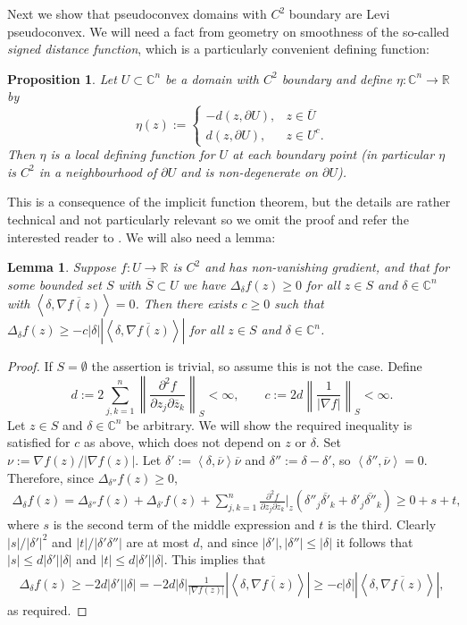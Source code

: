 \documentclass[11pt,a4paper, final, twoside]{article}
\newtheorem{lemma}[theorem]{Lemma}
\newtheorem{proposition}[theorem]{Proposition}
\numberwithin{equation}{section}
\newcommand{\C}{\mathbb C}
\newcommand{\R}{\mathbb R}
\newcommand{\con}[1]{\overline{#1}}
\newcommand{\clos}[1]{\overline{#1}}
\newcommand{\bd}{\partial}
\newcommand{\emetric}{d}
\newcommand{\cts}{C}
\renewcommand{\sp}[2]{\left<#1,#2\right>}
\newcommand{\sprod}[2]{\sp{#1}{#2}}
\newcommand{\cgrad}[1]{\nabla #1}
\begin{document}
Next we show that pseudoconvex domains with $\cts^2$ boundary are Levi pseudoconvex.
We will need a fact from geometry on smoothness of the so-called \emph{signed distance function}, which is a particularly convenient defining function:
\begin{proposition}
\label{sigsmooth}
Let $U\subset\C^n$ be a domain with $\cts^2$ boundary and define $\eta\colon\C^n\to\R$ by
$$ \eta(z) := \begin{cases} -\emetric(z,\bd U),& z\in\clos{U} \\ \emetric(z,\bd U),& z\in U^c.\end{cases}$$
Then $\eta$ is a local defining function for $U$ at each boundary point (in particular $\eta$ is $C^2$ in a neighbourhood of $\bd U$ and is non-degenerate on $\bd U$).
\end{proposition}
This is a consequence of the implicit function theorem, but the details are rather technical and not particularly relevant so we omit the proof and refer the interested 
reader to \cite[page 136]{krantz}.
We will also need a lemma:
\begin{lemma}
\label{levilemma}
Suppose $f\colon U\to\R$ is $\cts^2$ and has non-vanishing gradient, and that for some bounded set $S$ with $\clos{S}\subset U$ we have
$\Delta_\delta f(z)\geq 0$ for all $z\in S$ and $\delta\in\C^n$ with $\sprod{\delta}{\con{\cgrad{f}(z)}}=0$. Then there exists $c\geq 0$ such that 
$\Delta_\delta f(z)\geq -c|\delta|\left|\sprod{\delta}{\con{\cgrad{f}(z)}}\right|$ for all $z\in S$ and $\delta\in\C^n$.
\end{lemma}
\begin{proof}
If $S=\emptyset$ the assertion is trivial, so assume this is not the case.
Define
$$ d:=2\sum_{j,k=1}^n \left\|\frac{\partial^2f}{\partial z_j\partial\con z_k}\right\|_S<\infty, \qquad c:=2d\left\|\frac{1}{\left|\cgrad{f}\right|}\right\|_S<\infty.$$
Let $z\in S$ and $\delta\in\C^n$ be arbitrary. We will show the required inequality is satisfied for $c$ as above, which does not depend on $z$ or $\delta$.
Set $\nu:=\cgrad{f}(z)/\left|\cgrad{f}(z)\right|$. Let $\delta':=\sprod{\delta}{\con\nu}\con\nu$ and $\delta'':=\delta-\delta'$, so $\sprod{\delta''}{\con\nu}=0$.
Therefore, since $\Delta_{\delta''}f(z)\geq 0$, 
\begin{align*}
 \Delta_\delta f(z)=\Delta_{\delta''} f(z)+\Delta_{\delta'} f(z)+\sum_{j,k=1}^n \frac{\partial^2f}{\partial z_j\partial\con z_k}\bigg|_z \left(\delta''_j\con{\delta'}_k+\delta'_j\con{\delta''}_k\right) 
	\geq 0+s+t,
\end{align*}
where $s$ is the second term of the middle expression and $t$ is the third. Clearly $|s|/|\delta'|^2$ and $|t|/|\delta'\delta''|$ are at most $d$,
and since $|\delta'|,|\delta''|\leq |\delta|$ it follows
that $|s|\leq d|\delta'||\delta|$ and $|t|\leq d|\delta'||\delta|$. This implies that 
\begin{align*}
\Delta_\delta f(z)\geq -2d|\delta'||\delta|
=-2d|\delta|\frac{1}{\left|\cgrad{f}(z)\right|}\left|\sprod{\delta}{\con{\cgrad{f}(z)}}\right| \geq -c|\delta|\left|\sprod{\delta}{\con{\cgrad{f}(z)}}\right|,
\end{align*}
as required.
\end{proof}
\end{document}
